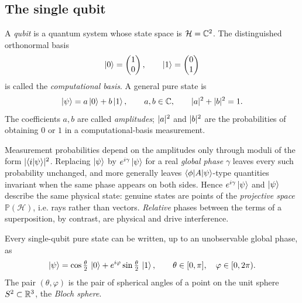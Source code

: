 \subsection{The single qubit}

\begin{definition}\label{l1:def:qubit}
A \emph{qubit} is a quantum system whose state space is $\mathcal{H}=\mathbb{C}^{2}$. The
distinguished orthonormal basis
\[
  \ket{0}=\begin{pmatrix}1\\0\end{pmatrix},\qquad
  \ket{1}=\begin{pmatrix}0\\1\end{pmatrix}
\]
is called the \emph{computational basis}. A general pure state is
\begin{equation}\label{l1:eq:qubit}
  \ket{\psi}=a\ket{0}+b\ket{1},\qquad a,b\in\mathbb{C},\qquad \lvert a\rvert^{2}+\lvert b\rvert^{2}=1 .
\end{equation}
The coefficients $a,b$ are called \emph{amplitudes}; $\lvert a\rvert^{2}$ and $\lvert b\rvert^{2}$
are the probabilities of obtaining $0$ or $1$ in a computational-basis measurement.
\end{definition}

\begin{remark}\label{l1:rem:global}
Measurement probabilities depend on the amplitudes only through moduli of the form
$\lvert\braket{i|\psi}\rvert^{2}$. Replacing $\ket{\psi}$ by $e^{i\gamma}\ket{\psi}$ for a
real \emph{global phase} $\gamma$ leaves every such probability unchanged, and more
generally leaves $\braket{\phi|A|\psi}$-type quantities invariant when the same
phase appears on both sides. Hence $e^{i\gamma}\ket{\psi}$ and $\ket{\psi}$ describe
the same physical state: genuine states are points of the \emph{projective space}
$\mathbb{P}(\mathcal{H})$, i.e. rays rather than vectors. \emph{Relative} phases
between the terms of a superposition, by contrast, are physical and drive
interference.
\end{remark}

\begin{proposition}\label{l1:prop:bloch}
Every single-qubit pure state can be written, up to an unobservable global phase, as
\begin{equation}\label{l1:eq:blochform}
  \ket{\psi}=\cos\tfrac{\theta}{2}\,\ket{0}+e^{i\varphi}\sin\tfrac{\theta}{2}\,\ket{1},
  \qquad \theta\in[0,\pi],\quad \varphi\in[0,2\pi).
\end{equation}
The pair $(\theta,\varphi)$ is the pair of spherical angles of a point on the unit
sphere $S^{2}\subset\mathbb{R}^{3}$, the \emph{Bloch sphere}.
\end{proposition}

